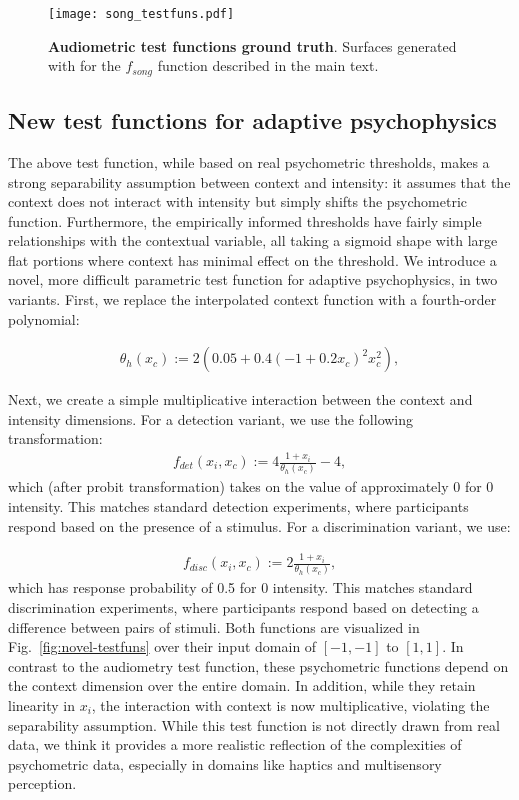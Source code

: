 \documentclass[../main.tex]{subfiles}
\begin{document}
\begin{figure}[htb]
  \centering
  \texttt{[image: song\_testfuns.pdf]}
  \caption{\textbf{Audiometric test functions ground truth}. Surfaces generated with  for the $f_{song}$ function described in the main text.}
  \label{fig:audiometric-thresholds}
\end{figure}

\subsection{New test functions for adaptive psychophysics}
The above test function, while based on real psychometric thresholds, makes a strong separability assumption between context and intensity: it assumes that the context does not interact with intensity but simply shifts the psychometric function. Furthermore, the empirically informed thresholds have fairly simple relationships with the contextual variable, all taking a sigmoid shape with large flat portions where context has minimal effect on the threshold. We introduce a novel, more difficult parametric test function for adaptive psychophysics, in two variants. First, we replace the interpolated context function with a fourth-order polynomial:

\begin{align}
  \theta_h(x_c) := 2(0.05 + 0.4(-1 + 0.2x_c)^2 x_c^2),
\end{align}

Next, we create a simple multiplicative interaction between the context and intensity dimensions. For a detection variant, we use the following transformation:
\begin{align}
  f_{det}(x_i, x_c) := 4\frac{1 + x_i}{\theta_h(x_c)} - 4,
\end{align}
which (after probit transformation) takes on the value of approximately 0 for 0 intensity. This matches standard detection experiments, where participants respond based on the presence of a stimulus. For a discrimination variant, we use:

\begin{align}
  f_{disc}(x_i, x_c) := 2\frac{1 + x_i}{\theta_h(x_c)},
\end{align}
which has response probability of 0.5 for 0 intensity. This matches standard discrimination experiments, where participants respond based on detecting a difference between pairs of stimuli. Both functions are visualized in Fig.~\ref{fig:novel-testfuns} over their input domain of $[-1, -1]$ to $[1, 1]$. In contrast to the audiometry test function, these psychometric functions depend on the context dimension over the entire domain. In addition, while they retain linearity in $x_i$, the interaction with context is now multiplicative, violating the separability assumption. While this test function is not directly drawn from real data, we think it provides a more realistic reflection of the complexities of psychometric data, especially in domains like haptics and multisensory perception.
\end{document}
